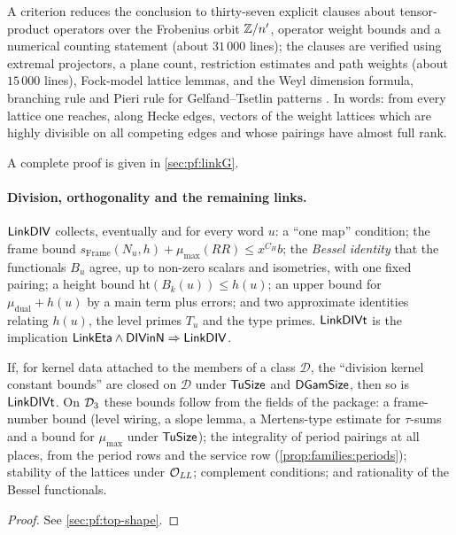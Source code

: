 \begin{proofoutline}
A criterion reduces the conclusion to thirty-seven explicit clauses about tensor-product operators over the
Frobenius orbit $\mathbb{Z}/n'$, operator weight bounds and a numerical counting statement (about $31\,000$ lines); the
clauses are verified using extremal projectors, a plane count, restriction estimates and path weights (about
$15\,000$ lines), Fock-model lattice lemmas, and the Weyl dimension formula, branching rule and Pieri rule for
Gelfand--Tsetlin patterns \cite{Weyl1946,GelfandTsetlin1950}. In words: from every lattice one reaches, along Hecke
edges, vectors of the weight lattices which are highly divisible on all competing edges and whose pairings have
almost full rank.

A complete proof is given in \cref{sec:pf:linkG}.
\end{proofoutline}

\paragraph{Division, orthogonality and the remaining links.}
$\mathsf{LinkDIV}$ collects, eventually and for every word $u$: a ``one map'' condition; the frame bound
$s_{\mathrm{Frame}}(N_u,h)+\mu_{\max}(\mathit{RR})\le x^{C_H}b$; the \emph{Bessel identity} that the functionals
$B_u$ agree, up to non-zero scalars and isometries, with one fixed pairing; a height bound
$\mathrm{ht}(B_k(u))\le h(u)$; an upper bound for $\mu_{\mathrm{dual}}+h(u)$ by a main term plus errors; and two
approximate identities relating $h(u)$, the level primes $T_u$ and the type primes. $\mathsf{LinkDIVt}$ is the
implication $\mathsf{LinkEta}\wedge\mathsf{DIVinN}\Rightarrow\mathsf{LinkDIV}$.

\begin{proposition}\Fmark\label{prop:families:div}
If, for kernel data attached to the members of a class $\mathcal D$, the ``division kernel constant bounds'' are
closed on $\mathcal D$ under $\mathsf{TuSize}$ and $\mathsf{DGamSize}$, then so is $\mathsf{LinkDIVt}$. On
$\mathcal{D}_3$ these bounds follow from the fields of the package: a frame-number bound (level wiring, a slope
lemma, a Mertens-type estimate for $\tau$-sums and a bound for $\mu_{\max}$ under $\mathsf{TuSize}$); the
integrality of period pairings at all places, from the period rows and the service row
(\cref{prop:families:periods}); stability of the lattices under $\mathcal{O}_{\mathit{LL}}$; complement conditions; and
rationality of the Bessel functionals.
\end{proposition}
\begin{proof}See \cref{sec:pf:top-shape}.
\end{proof}


